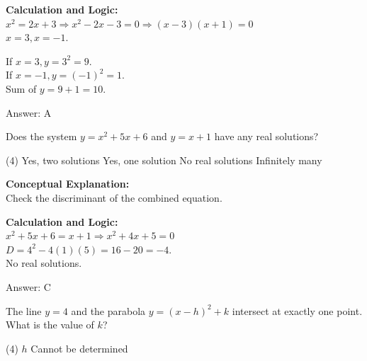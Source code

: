 \documentclass[11pt,paper=a4,answers]{exam}
\begin{document}
\begin{questions}
\begin{solution}
\textbf{Calculation and Logic:} \\
$x^2 = 2x + 3 \Rightarrow x^2 - 2x - 3 = 0 \Rightarrow (x - 3)(x + 1) = 0$ \\
$x = 3, x = -1$.

\vspace{10pt}

If $x = 3, y = 3^2 = 9$. \\
If $x = -1, y = (-1)^2 = 1$. \\
Sum of $y = 9 + 1 = 10$.

\vspace{25pt}

Answer: \colorbox{yellow!100}{A}
\end{solution}

\vspace{40pt}

\question
Does the system $y = x^2 + 5x + 6$ and $y = x + 1$ have any real solutions?
\begin{tasks}(4)
    \task Yes, two solutions
    \task Yes, one solution
    \task No real solutions
    \task Infinitely many
\end{tasks}

\begin{solution}
\textbf{Conceptual Explanation:} \\
Check the discriminant of the combined equation.

\vspace{20pt}

\textbf{Calculation and Logic:} \\
$x^2 + 5x + 6 = x + 1 \Rightarrow x^2 + 4x + 5 = 0$ \\
$D = 4^2 - 4(1)(5) = 16 - 20 = -4$. \\
No real solutions.

\vspace{25pt}

Answer: \colorbox{yellow!100}{C}
\end{solution}

\vspace{40pt}

\question
The line $y = 4$ and the parabola $y = (x - h)^2 + k$ intersect at exactly one point. What is the value of $k$?
\begin{tasks}(4)
    \task $h$
    \task Cannot be determined
\end{tasks}


\end{questions}
\end{document}
